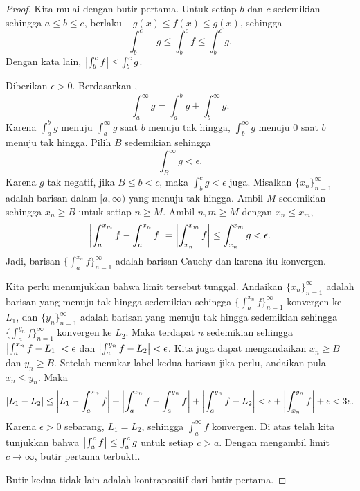 \begin{proof}
Kita mulai dengan butir pertama.
Untuk setiap $b$ dan $c$ sedemikian sehingga $a \leq b \leq c$, berlaku 
$-g(x) \leq f(x) \leq g(x)$, sehingga
\begin{equation*}
\int_b^c -g \leq \int_b^c f \leq \int_b^c g  .
\end{equation*}
Dengan kata lain, $\left\lvert {\int_b^c f} \right\rvert \leq \int_b^c g$.

Diberikan $\epsilon > 0$.  Berdasarkan
,
\begin{equation*}
\int_a^\infty g =
\int_a^b g +
\int_b^\infty g .
\end{equation*}
Karena $\int_a^b g$ menuju
$\int_a^\infty g$ saat $b$ menuju tak hingga,
$\int_b^\infty g$ menuju 0 saat $b$ menuju tak hingga.  Pilih $B$
sedemikian sehingga
\begin{equation*}
\int_B^\infty g < \epsilon .
\end{equation*}
Karena $g$ tak negatif, jika $B \leq b < c$, maka
$\int_b^c g < \epsilon$ juga.
Misalkan $\{ x_n \}_{n=1}^\infty$ adalah barisan dalam $[a,\infty)$ yang menuju tak hingga.  Ambil $M$ sedemikian sehingga
$x_n \geq B$ untuk setiap $n \geq M$.  Ambil $n, m \geq M$
dengan $x_n \leq x_m$,
\begin{equation*}
\left\lvert {\int_a^{x_m} f - \int_a^{x_n} f} \right\rvert 
=
\left\lvert {\int_{x_n}^{x_m} f} \right\rvert 
\leq \int_{x_n}^{x_m} g < \epsilon .
\end{equation*}
Jadi, barisan $\bigl\{ \int_a^{x_n} f \bigr\}_{n=1}^\infty$ adalah barisan Cauchy dan karena itu konvergen.

Kita perlu menunjukkan bahwa limit tersebut tunggal.  Andaikan $\{ x_n \}_{n=1}^\infty$ adalah barisan
yang menuju tak hingga sedemikian sehingga
$\bigl\{ \int_a^{x_n} f \bigr\}_{n=1}^\infty$ konvergen ke $L_1$, dan $\{
y_n \}_{n=1}^\infty$ adalah barisan
yang menuju tak hingga sedemikian sehingga
$\bigl\{ \int_a^{y_n} f \bigr\}_{n=1}^\infty$ konvergen ke $L_2$.  Maka terdapat $n$ sedemikian
sehingga
$\bigl\lvert {\int_a^{x_n} f - L_1} \bigr\rvert < \epsilon$ dan 
$\bigl\lvert {\int_a^{y_n} f - L_2} \bigr\rvert < \epsilon$.  Kita juga dapat mengandaikan $x_n \geq B$
dan $y_n \geq B$.  Setelah menukar label kedua barisan jika perlu, andaikan pula $x_n \leq y_n$.  Maka
\begin{equation*}
\lvert {L_1 - L_2} \rvert \leq
\left\lvert {L_1 - \int_a^{x_n} f} \right\rvert
+
\left\lvert {\int_a^{x_n} f- \int_a^{y_n} f} \right\rvert
+
\left\lvert {\int_a^{y_n} f - L_2} \right\rvert
<
\epsilon
+
\left\lvert {\int_{x_n}^{y_n} f} \right\rvert
+
\epsilon
<
3 \epsilon.
\end{equation*}
Karena $\epsilon > 0$ sebarang, $L_1 = L_2$, sehingga
$\int_a^\infty f$ konvergen.
Di atas telah kita tunjukkan bahwa $\left\lvert {\int_a^c f} \right\rvert \leq \int_a^c g$ untuk setiap $c > a$.
Dengan mengambil limit $c \to \infty$, butir pertama terbukti.

Butir kedua tidak lain adalah kontrapositif dari butir pertama.
\end{proof}

